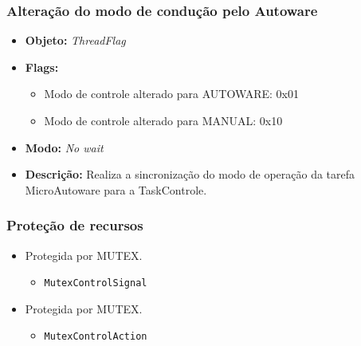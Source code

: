 \subsubsection*{Alteração do modo de condução pelo Autoware}
	
	\begin{itemize}
		\item \textbf{Objeto:} \textit{ThreadFlag}
		\item \textbf{Flags:}
		\begin{itemize}
			\item Modo de controle alterado para AUTOWARE: 0x01
			\item Modo de controle alterado para MANUAL: 0x10
			
		\end{itemize}
		\item \textbf{Modo:} \textit{No wait}
		\item \textbf{Descrição:} Realiza a sincronização do modo de operação da tarefa MicroAutoware para a TaskControle.
		
	\end{itemize}


\subsubsection*{Proteção de recursos}



	
	\begin{itemize}
		\item Protegida por MUTEX.
		\begin{itemize}
			\item \texttt{MutexControlSignal}
			
		\end{itemize}
	\end{itemize}



	
	\begin{itemize}
		\item Protegida por MUTEX.
		\begin{itemize}
			\item \texttt{MutexControlAction}
			
		\end{itemize}
		
	\end{itemize}

